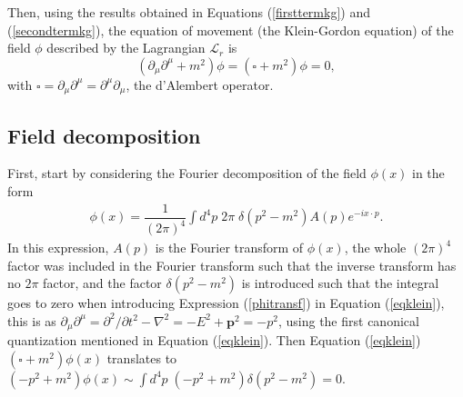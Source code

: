 Then, using the results obtained in Equations (\ref{firsttermkg}) and (\ref{secondtermkg}), the equation of movement (the Klein-Gordon equation) of the field $\phi$ described by the Lagrangian $\mathcal{L}_r$ is
\begin{equation*}
    (\partial_{\mu}\partial^{\mu} + m^2)\phi = (\square + m^2)\phi = 0,
\end{equation*}
with $\square = \partial_{\mu}\partial^{\mu} = \partial^{\mu}\partial_{\mu}$, the d'Alembert operator.

\subsection{Field decomposition}

First, start by considering the Fourier decomposition of the field $\phi(x)$ in the form
\begin{gather}
\label{phitransf}
    \phi(x) = \dfrac{1}{(2\pi)^4}\int d^4p \; 2\pi \; \delta(p^2 - m^2) A(p)e^{-ix\cdot p}.
\end{gather}
In this expression, $A(p)$ is the Fourier transform of $\phi(x)$, the whole $(2\pi)^4$ factor was included in the Fourier transform such that the inverse transform has no $2\pi$ factor, and the factor $\delta(p^2 - m^2)$ is introduced such that the integral goes to zero when introducing Expression (\ref{phitransf}) in Equation (\ref{eqklein}), this is as $\partial_{\mu}\partial^{\mu} = \partial^2/\partial t^2 - \nabla^2 = -E^2 + \bm{p}^2 = -p^2$, using the first canonical quantization mentioned in Equation (\ref{eqklein}). Then Equation (\ref{eqklein}) $(\square + m^2)\phi(x)$  translates to $(-p^2 + m^2)\phi(x) \sim \int d^4p \; (-p^2 + m^2) \delta(p^2 - m^2) = 0$.

